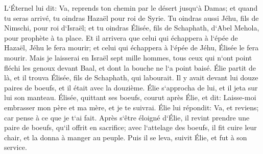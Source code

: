 \verse L`Éternel lui dit: Va, reprends ton chemin par le désert jusqu`à Damas; et quand tu seras arrivé, tu oindras Hazaël pour roi de Syrie. 
\verse Tu oindras aussi Jéhu, fils de Nimschi, pour roi d`Israël; et tu oindras Élisée, fils de Schaphath, d`Abel Mehola, pour prophète à ta place. 
\verse Et il arrivera que celui qui échappera à l`épée de Hazaël, Jéhu le fera mourir; et celui qui échappera à l`épée de Jéhu, Élisée le fera mourir. 
\verse Mais je laisserai en Israël sept mille hommes, tous ceux qui n`ont point fléchi les genoux devant Baal, et dont la bouche ne l`a point baisé. 
\verse Élie partit de là, et il trouva Élisée, fils de Schaphath, qui labourait. Il y avait devant lui douze paires de boeufs, et il était avec la douzième. Élie s`approcha de lui, et il jeta sur lui son manteau. 
\verse Élisée, quittant ses boeufs, courut après Élie, et dit: Laisse-moi embrasser mon père et ma mère, et je te suivrai. Élie lui répondit: Va, et reviens; car pense à ce que je t`ai fait. 
\verse Après s`être éloigné d`Élie, il revint prendre une paire de boeufs, qu`il offrit en sacrifice; avec l`attelage des boeufs, il fit cuire leur chair, et la donna à manger au peuple. Puis il se leva, suivit Élie, et fut à son service. 

\chapter{}

